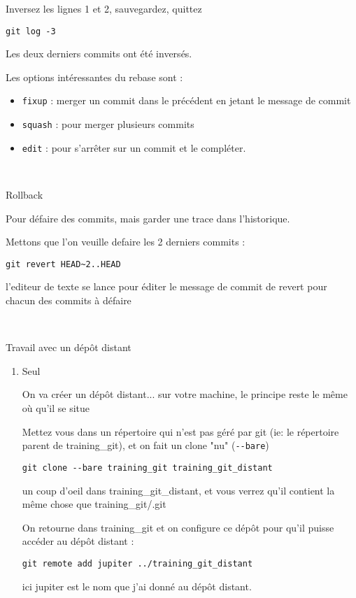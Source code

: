 \documentclass[10pt]{exam}
\begin{document}
\begin{questions}
\begin{enumerate}
Inversez les lignes 1 et 2, sauvegardez, quittez
\begin{lstlisting}
git log -3
\end{lstlisting}
Les deux derniers commits ont été inversés.

Les options intéressantes du rebase sont :
\begin{itemize}
\item\texttt{fixup} : merger un commit dans le précédent en jetant le message de commit
\item\texttt{squash} : pour merger plusieurs commits
\item\texttt{edit} : pour s'arrêter sur un commit et le compléter.
\end{itemize}
\end{enumerate}

~

\question Rollback

Pour défaire des commits, mais garder une trace dans l'historique.

Mettons que l'on veuille defaire les 2 derniers commits :
\begin{lstlisting}
git revert HEAD~2..HEAD
\end{lstlisting}
l'editeur de texte se lance pour éditer le message de commit de revert pour chacun des commits à défaire

~

\question Travail avec un dépôt distant

\begin{enumerate}
\item Seul

On va créer un dépôt distant... sur votre machine, le principe reste le même où qu'il se situe

Mettez vous dans un répertoire qui n'est pas géré par git (ie: le répertoire parent de training\_git), et on fait un clone "nu" (\texttt{-{}-bare})
\begin{lstlisting}
git clone --bare training_git training_git_distant
\end{lstlisting}
un coup d'oeil dans training\_git\_distant, et vous verrez qu'il contient la même chose que training\_git/.git

On retourne dans training\_git et on configure ce dépôt pour qu'il puisse accéder au dépôt distant :
\begin{lstlisting}
git remote add jupiter ../training_git_distant
\end{lstlisting}
ici jupiter est le nom que j'ai donné au dépôt distant.


\end{enumerate}
\end{questions}
\end{document}
